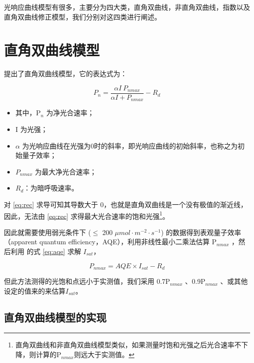 \documentclass[
]{krantz}
\providecommand{\tightlist}{%
  \setlength{\itemsep}{0pt}\setlength{\parskip}{0pt}}
\begin{document}
光响应曲线模型有很多，主要分为四大类，直角双曲线，非直角双曲线，指数以及直角双曲线修正模型，我们分别对这四类进行阐述。

\hypertarget{rec_mod}{%
\section{直角双曲线模型}\label{rec_mod}}

\citet{BalyEC1935} 提出了直角双曲线模型，它的表达式为：

\begin{equation}
P_{n}  = \frac{\alpha I\ P_{nmax}}{\alpha I + P_{nmax}}- R_{d}
\label{eq:rec}
\end{equation}

\begin{itemize}
\tightlist
\item
  其中，P\(_{n}\) 为净光合速率；
\item
  I 为光强；
\item
  \(\alpha\) 为光响应曲线在光强为0时的斜率，即光响应曲线的初始斜率，也称之为初始量子效率；
\item
  \(P_{nmax}\) 为最大净光合速率；
\item
  \(R_{d}\)：为暗呼吸速率。
\end{itemize}

对 \eqref{eq:rec} 求导可知其导数大于 0，也就是直角双曲线是一个没有极值的渐近线，因此，无法由 \eqref{eq:rec} 求得最大光合速率的饱和光强\footnote{直角双曲线和非直角双曲线模型类似，如果测量时饱和光强之后光合速率不下降，则计算的P\(_{nmax}\)则远大于实测值。}。

因此就需要使用弱光条件下
(\(\leq\) 200 \(\mu mol\cdot m^{-2}\cdot s^{-1}\)) 的数据得到表观量子效率（apparent
quantum efficiency，AQE），利用非线性最小二乘法估算 P\(_{nmax}\) ，然后利用 \citet{YEZiPiao2010} 的式 \eqref{eq:aqe} 求解 \(I_{sat}\)，

\begin{equation}
P_{nmax}= AQE \times I_{sat} - R_{d}
\label{eq:aqe}
\end{equation}

但此方法测得的光饱和点远小于实测值，我们采用 0.7P\(_{nmax}\) \citet{ZhangXS2009}、0.9P\(_{nmax}\)
\citet{HuangHY2009}、或其他设定的值来的来估算\(I_{sat}\)。

\hypertarget{rec_fit}{%
\subsection{直角双曲线模型的实现}\label{rec_fit}}
\end{document}
